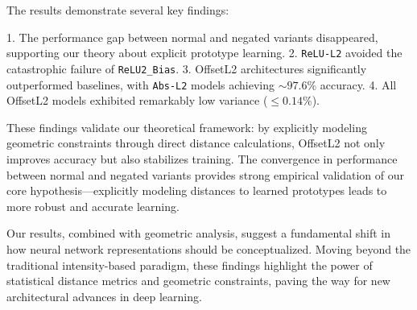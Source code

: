 The results demonstrate several key findings:

1. The performance gap between normal and negated variants disappeared, supporting our theory about explicit prototype learning.
2. \texttt{ReLU-L2} avoided the catastrophic failure of \texttt{ReLU2\_Bias}.
3. OffsetL2 architectures significantly outperformed baselines, with \texttt{Abs-L2} models achieving $\sim 97.6\%$ accuracy.
4. All OffsetL2 models exhibited remarkably low variance ($\leq 0.14\%$).

These findings validate our theoretical framework: by explicitly modeling geometric constraints through direct distance calculations, OffsetL2 not only improves accuracy but also stabilizes training. The convergence in performance between normal and negated variants provides strong empirical validation of our core hypothesis—explicitly modeling distances to learned prototypes leads to more robust and accurate learning.

Our results, combined with geometric analysis, suggest a fundamental shift in how neural network representations should be conceptualized. Moving beyond the traditional intensity-based paradigm, these findings highlight the power of statistical distance metrics and geometric constraints, paving the way for new architectural advances in deep learning.
